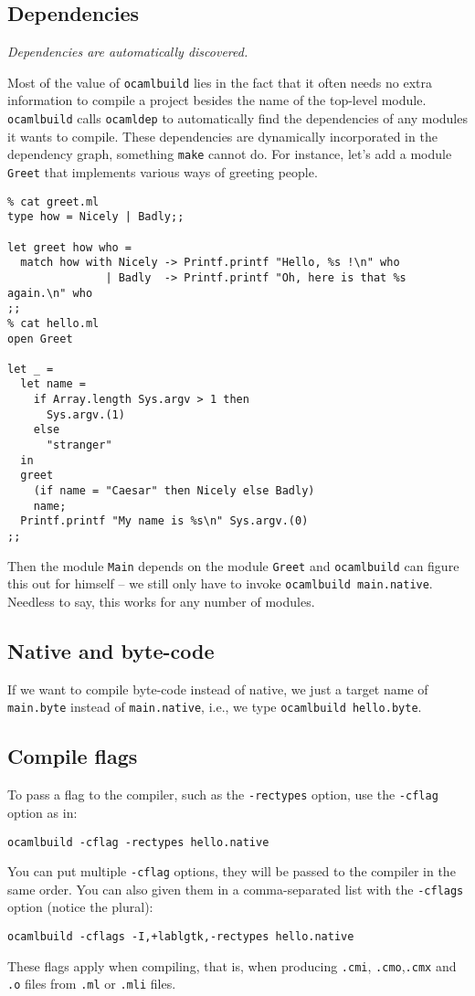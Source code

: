 \documentclass[9pt]{article}
\newcommand{\ocb}{\texttt{ocamlbuild}\xspace}
\begin{document}
\subsection{Dependencies}
{\em Dependencies are automatically discovered.}

Most of the value of \ocb lies in the fact that it often needs no extra
information to compile a project besides the name of the top-level module.
\ocb calls \texttt{ocamldep} to automatically find the dependencies of any
modules it wants to compile.  These dependencies are dynamically incorporated
in the dependency graph, something \texttt{make} cannot do.
For instance, let's add a module \texttt{Greet} that implements various ways of
greeting people.
\begin{verbatim}
% cat greet.ml
type how = Nicely | Badly;;

let greet how who =
  match how with Nicely -> Printf.printf "Hello, %s !\n" who
               | Badly  -> Printf.printf "Oh, here is that %s again.\n" who
;;
% cat hello.ml
open Greet

let _ =
  let name =
    if Array.length Sys.argv > 1 then
      Sys.argv.(1)
    else
      "stranger"
  in
  greet
    (if name = "Caesar" then Nicely else Badly)
    name;
  Printf.printf "My name is %s\n" Sys.argv.(0)
;;
\end{verbatim}
Then the module \texttt{Main} depends on the module \texttt{Greet} and \ocb can
figure this out for himself -- we still only have to invoke \texttt{\ocb
main.native}.  Needless to say, this works for any number of modules.
\subsection{Native and byte-code}
If we want to compile byte-code instead of native, we just a target name of
\texttt{main.byte} instead of \texttt{main.native}, i.e., we type
\texttt{\ocb hello.byte}.
\subsection{Compile flags}
To pass a flag to the compiler, such as the \texttt{-rectypes} option,
use the \texttt{-cflag} option as in:
\begin{verbatim}
ocamlbuild -cflag -rectypes hello.native
\end{verbatim}
You can put multiple \texttt{-cflag} options, they will be passed to the compiler
in the same order.  You can also given them in a comma-separated list with the
\texttt{-cflags} option (notice the plural):
\begin{verbatim}
ocamlbuild -cflags -I,+lablgtk,-rectypes hello.native
\end{verbatim}
These flags apply when compiling, that is, when producing \texttt{.cmi},
\texttt{.cmo},\texttt{.cmx} and \texttt{.o} files from \texttt{.ml} or
\texttt{.mli} files.
\end{document}
